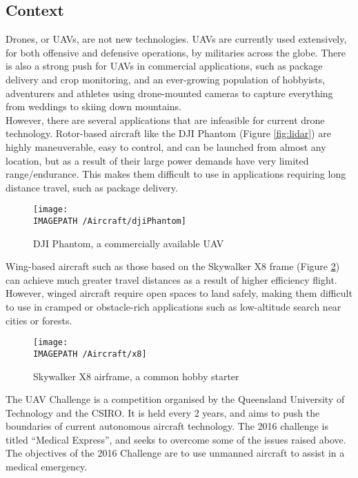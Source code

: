 \subsection{Context}
Drones, or UAVs, are not new technologies. UAVs are currently used extensively, for both offensive and defensive operations, by militaries across the globe. There is also a strong push for UAVs in commercial applications, such as package delivery and crop monitoring, and an ever-growing population of hobbyists, adventurers and athletes using drone-mounted cameras to capture everything from weddings to skiing down mountains.\\

However, there are several applications that are infeasible for current drone technology. Rotor-based aircraft like the DJI Phantom (Figure \ref{fig:lidar}) are highly maneuverable, easy to control, and can be launched from almost any location, but as a result of their large power demands have very limited range/endurance. This makes them difficult to use in applications requiring long distance travel, such as package delivery.

\begin{figure}[!h]
	\centering
	\texttt{[image: \\IMAGEPATH /Aircraft/djiPhantom]}
	\caption{DJI Phantom, a commercially available UAV}
	\label{fig:dji}
\end{figure}

Wing-based aircraft such as those based on the Skywalker X8 frame (Figure \ref{fig:x8}) can achieve much greater travel distances as a result of higher efficiency flight. However, winged aircraft require open spaces to land safely, making them difficult to use in cramped or obstacle-rich applications such as low-altitude search near cities or forests.

\begin{figure}[!h]
	\centering
	\texttt{[image: \\IMAGEPATH /Aircraft/x8]}
	\caption{Skywalker X8 airframe, a common hobby starter}
	\label{fig:x8}
\end{figure}
 
The UAV Challenge is a competition organised by the Queensland University of Technology and the CSIRO. It is held every 2 years, and aims to push the boundaries of current autonomous aircraft technology. The 2016 challenge is titled ``Medical Express'', and seeks to overcome some of the issues raised above. The objectives of the 2016 Challenge are to use unmanned aircraft to assist in a medical emergency.\\

